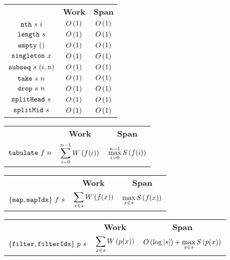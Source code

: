 \begin{costspec}
\begin{tabular}{c|c|c}
& \textbf{Work} & \textbf{Span} \\
$\texttt{nth}~s~i$ & $O\left({1}\right)$ & $O\left({1}\right)$ \\
$\texttt{length}~s$ & $O\left({1}\right)$ & $O\left({1}\right)$ \\
$\texttt{empty}~()$ & $O\left({1}\right)$ & $O\left({1}\right)$ \\
$\texttt{singleton}~x$ & $O\left({1}\right)$ & $O\left({1}\right)$ \\
$\texttt{subseq}~s~(i,n)$ & $O\left({1}\right)$ & $O\left({1}\right)$ \\
$\texttt{take}~s~n$ & $O\left({1}\right)$ & $O\left({1}\right)$ \\
$\texttt{drop}~s~n$ & $O\left({1}\right)$ & $O\left({1}\right)$ \\
$\texttt{splitHead}~s$ & $O\left({1}\right)$ & $O\left({1}\right)$ \\
$\texttt{splitMid}~s$ & $O\left({1}\right)$ & $O\left({1}\right)$
\end{tabular}
\end{costspec}

\begin{costspec}[Tabulate]
\begin{tabular}{c|c|c}
& \textbf{Work} & \textbf{Span} \\
%
$\texttt{tabulate}~f~n$ &
$\displaystyle \sum_{i = 0}^{n-1} W\left({f(i)}\right)$ &
$\displaystyle \max_{i = 0}^{n-1} S\left({f(i)}\right)$ \\
%
\end{tabular}
\end{costspec}



\begin{costspec}[Map]
\begin{tabular}{c|c|c}
& \textbf{Work} & \textbf{Span} \\
%
$\{\texttt{map},\texttt{mapIdx}\}~f~s$ &
$\displaystyle \sum_{x \in s} W\left({f(x)}\right)$ &
$\displaystyle \max_{x \in s} S\left({f(x)}\right)$ \\
%
\end{tabular}
\end{costspec}

\begin{costspec}[Filter]
\begin{tabular}{c|c|c}
& \textbf{Work} & \textbf{Span} \\
%
$\{\texttt{filter},\texttt{filterIdx}\}~p~s$ &
$\displaystyle \sum_{x \in s} W\left({p(x)}\right)$ &
$\displaystyle O\left({\log{|s|}}\right) + \max_{x \in s} S\left({p(x)}\right)$ \\
%
\end{tabular}
\end{costspec}

